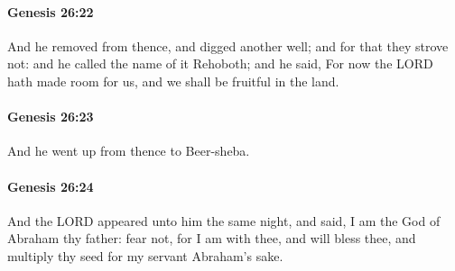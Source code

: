 		\paragraph{Genesis 26:22} %
			\label{GENESIS-26-22}

			And he removed from thence, and digged another well; and for that they strove not: and he called the name of it Rehoboth; and he said, For now the LORD hath made room for us, and we shall be fruitful in the land.


		\paragraph{Genesis 26:23} %
			\label{GENESIS-26-23}

			And he went up from thence to Beer-sheba.


		\paragraph{Genesis 26:24} %
			\label{GENESIS-26-24}

			And the LORD appeared unto him the same night, and said, I am the God of Abraham thy father: fear not, for I am with thee, and will bless thee, and multiply thy seed for my servant Abraham's sake.


